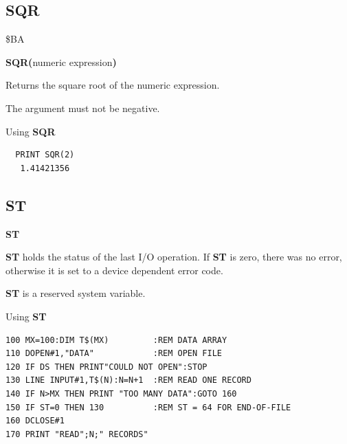 
\newpage
\subsection{SQR}
\begin{description}[leftmargin=2cm,style=nextline]
\item [Token:] \$BA
\item [Format:] {\bf SQR(}numeric expression{\bf)}
\item [Usage:] Returns the square root of the numeric expression.

\item [Remarks:] The argument must not be negative.
\item [Example:] Using {\bf SQR}
\begin{tcolorbox}[colback=black,coltext=white]
\verbatimfont{\codefont}
\begin{verbatim}
  PRINT SQR(2)
   1.41421356
\end{verbatim}
\end{tcolorbox}
\end{description}


\newpage
\subsection{ST}
\begin{description}[leftmargin=2cm,style=nextline]
\item [Format:] {\bf ST}
\item [Usage:]  {\bf ST} holds the status of the last I/O operation.
                If {\bf ST} is zero, there was no error, otherwise
                it is set to a device dependent error code.
\item[Remarks:] {\bf ST} is a reserved system variable.
\item [Example:] Using {\bf ST}
\begin{tcolorbox}[colback=black,coltext=white]
\verbatimfont{\codefont}
\begin{verbatim}
100 MX=100:DIM T$(MX)         :REM DATA ARRAY
110 DOPEN#1,"DATA"            :REM OPEN FILE
120 IF DS THEN PRINT"COULD NOT OPEN":STOP
130 LINE INPUT#1,T$(N):N=N+1  :REM READ ONE RECORD
140 IF N>MX THEN PRINT "TOO MANY DATA":GOTO 160
150 IF ST=0 THEN 130          :REM ST = 64 FOR END-OF-FILE
160 DCLOSE#1
170 PRINT "READ";N;" RECORDS"
\end{verbatim}
\end{tcolorbox}
\end{description}

